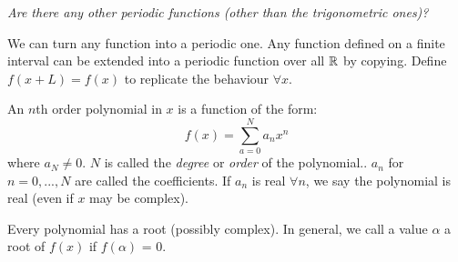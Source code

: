 \documentclass[twoside]{scrartcl}
\begin{document}
\emph{Are there any other periodic functions (other than the trigonometric ones)?}\\

  \begin{center}
\end{center}



We can turn any function into a periodic one. Any function defined on a finite interval can be extended into a periodic function over all $\mathbb{R}$ by copying. Define $f(x + L) = f(x)$ to replicate the behaviour $\forall x$.\\


\vspace*{5pt}
\begin{definition}
An $n$th order   polynomial in $x$ is a function of the form: \[f(x) = \displaystyle{\sum_{a=0}^{N} a_n x^n}\]
 where $a_N \neq 0$. $N$ is called the \emph{degree} or \emph{order} of the polynomial.. $a_n$ for $n = 0,...,N$ are called the coefficients. If $a_n$ is real $\forall n$, we say the polynomial is real (even if $x$ may be complex).
\end{definition}

\begin{theorem}

Every polynomial has a root (possibly complex). In general, we call a value $\alpha$ a root of $f(x)$ if $f(\alpha)$ = 0. 

\end{theorem}
\end{document}
